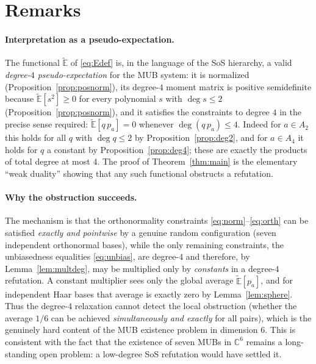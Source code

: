 \documentclass{amsart}
\theoremstyle{definition}
\begin{document}
\section{Remarks}\label{sec:remarks}

\paragraph{Interpretation as a pseudo-expectation.}
The functional $\widetilde{\mathbb{E}}$ of \eqref{eq:Edef} is, in the language of the SoS
hierarchy, a valid \emph{degree-$4$ pseudo-expectation} for the MUB system: it is normalized
(Proposition~\ref{prop:posnorm}), its degree-$4$ moment matrix is positive semidefinite
because $\widetilde{\mathbb{E}}[s^2]\ge0$ for every polynomial $s$ with $\deg s\le2$
(Proposition~\ref{prop:posnorm}), and it satisfies the constraints to degree $4$ in the precise
sense required: $\widetilde{\mathbb{E}}[q\,p_a]=0$ whenever $\deg(q\,p_a)\le4$. Indeed for
$a\in A_2$ this holds for all $q$ with $\deg q\le2$ by Proposition~\ref{prop:deg2}, and for
$a\in A_4$ it holds for $q$ a constant by Proposition~\ref{prop:deg4}; these are exactly the
products of total degree at most $4$. The proof of Theorem~\ref{thm:main} is the elementary
``weak duality'' showing that any such functional obstructs a refutation.

\paragraph{Why the obstruction succeeds.}
The mechanism is that the orthonormality constraints \eqref{eq:norm}--\eqref{eq:orth} can be
satisfied \emph{exactly and pointwise} by a genuine random configuration (seven independent
orthonormal bases), while the only remaining constraints, the unbiasedness equalities
\eqref{eq:unbias}, are degree-$4$ and therefore, by Lemma~\ref{lem:multdeg}, may be multiplied
only by \emph{constants} in a degree-$4$ refutation. A constant multiplier sees only the global
average $\widetilde{\mathbb{E}}[p_a]$, and for independent Haar bases that average is exactly
zero by Lemma~\ref{lem:sphere}. Thus the degree-$4$ relaxation cannot detect the local
obstruction (whether the average $1/6$ can be achieved \emph{simultaneously and exactly} for
all pairs), which is the genuinely hard content of the MUB existence problem in dimension $6$.
This is consistent with the fact that the existence of seven MUBs in $\mathbb{C}^6$ remains a
long-standing open problem: a low-degree SoS refutation would have settled it.
\end{document}
